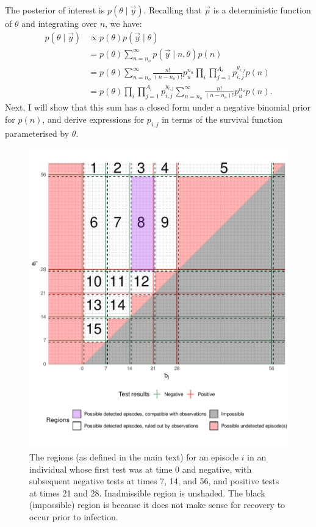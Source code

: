 \documentclass[thesis.tex]{subfiles}
\begin{document}
The posterior of interest is $p(\theta \mid \vec{y})$.
Recalling that $\vec{p}$ is a deterministic function of $\theta$ and integrating over $n$, we have:
\begin{align}
  p(\theta \mid \vec{y})
    &\propto p(\theta) p(\vec{y} \mid \theta) \\
    &= p(\theta) \sum_{n=n_o}^\infty p(\vec{y} \mid n, \theta) p(n) \\
    &= p(\theta) \sum_{n=n_o}^\infty \frac{n!}{(n - n_o)!} p_u^{n_u} \prod_{i} \prod_{j=1}^{A_i} p_{i,j}^{y_{i,j}} p(n) \\
    &= p(\theta) \prod_{i} \prod_{j=1}^{A_i} p_{i,j}^{y_{i,j}} \sum_{n=n_o}^\infty \frac{n!}{(n - n_o)!} p_u^{n_u} p(n).
\end{align}
Next, I will show that this sum has a closed form under a negative binomial prior for $p(n)$, and derive expressions for $p_{i,j}$ in terms of the survival function parameterised by $\theta$.

\begin{figure}
\includegraphics[width=\textwidth]{cis-perfect-testing/regions_diag}
\caption[Admissible, inadmissible, and undetected infections]{The regions (as defined in the main text) for an episode $i$ in an
individual whose first test was at time 0 and negative, with subsequent
negative tests at times 7, 14, and 56, and positive tests at times 21
and 28. Inadmissible region is unshaded. The black (impossible) region is because it does not make sense for recovery to occur prior to infection. \label{perf-test:fig:partitionSpace}}
\end{figure}
\end{document}
